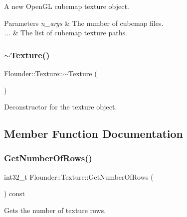 A new Open\+GL cubemap texture object. 


\begin{DoxyParams}{Parameters}
{\em n\+\_\+args} & The number of cubemap files. \\
\hline
{\em ...} & The list of cubemap texture paths. \\
\hline
\end{DoxyParams}
\mbox{\label{class_flounder_1_1_texture_a9233b9e412d9eab52b36c9d3b932ca58}} 
\subsubsection{\texorpdfstring{$\sim$\+Texture()}{~Texture()}}
{\footnotesize\ttfamily Flounder\+::\+Texture\+::$\sim$\+Texture (\begin{DoxyParamCaption}{ }\end{DoxyParamCaption})}



Deconstructor for the texture object. 



\subsection{Member Function Documentation}
\mbox{\label{class_flounder_1_1_texture_a8428b6733ac13ea3c4bce350cfcfca31}} 
\subsubsection{\texorpdfstring{Get\+Number\+Of\+Rows()}{GetNumberOfRows()}}
{\footnotesize\ttfamily int32\+\_\+t Flounder\+::\+Texture\+::\+Get\+Number\+Of\+Rows (\begin{DoxyParamCaption}{ }\end{DoxyParamCaption}) const\hspace{0.3cm}{\ttfamily [inline]}}



Gets the number of texture rows. 


